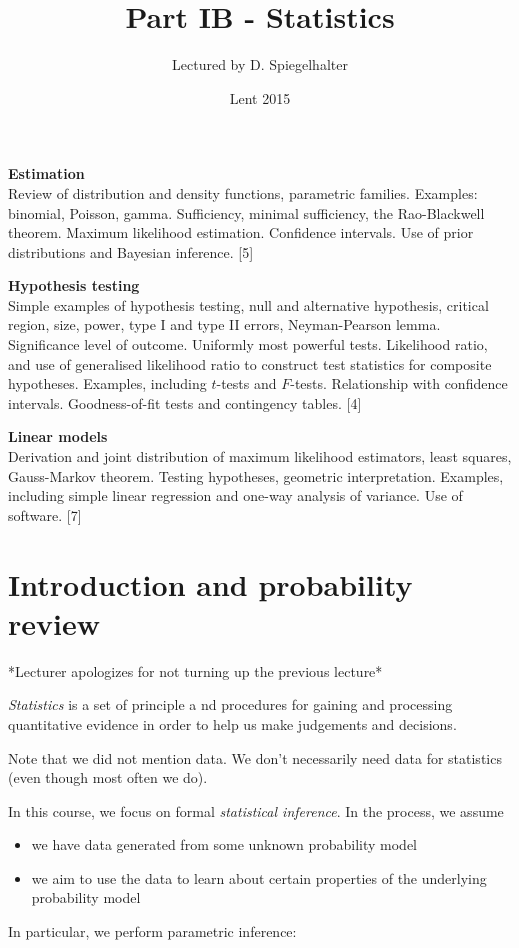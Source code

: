 \documentclass[a4paper]{article}
\title{Part IB - Statistics}
\author{Lectured by D. Spiegelhalter}
\date{Lent 2015}
\begin{document}
\maketitle
{\small
\noindent\textbf{Estimation}\\
Review of distribution and density functions, parametric families. Examples: binomial, Poisson, gamma.  Sufficiency, minimal sufficiency, the Rao-Blackwell theorem. Maximum likelihood estimation. Confidence intervals. Use of prior distributions and Bayesian inference.\hspace*{\fill} [5]

\vspace{10pt}
\noindent\textbf{Hypothesis testing}\\
Simple examples of hypothesis testing, null and alternative hypothesis, critical region, size, power, type I and type II errors, Neyman-Pearson lemma. Significance level of outcome. Uniformly most powerful tests. Likelihood ratio, and use of generalised likelihood ratio to construct test statistics for composite hypotheses. Examples, including $t$-tests and $F$-tests. Relationship with confidence intervals. Goodness-of-fit tests and contingency tables.\hspace*{\fill} [4]

\vspace{10pt}
\noindent\textbf{Linear models}\\
Derivation and joint distribution of maximum likelihood estimators, least squares, Gauss-Markov theorem. Testing hypotheses, geometric interpretation. Examples, including simple linear regression and one-way analysis of variance. Use of software.\hspace*{\fill} [7]}

\tableofcontents

\section{Introduction and probability review}
*Lecturer apologizes for not turning up the previous lecture*
\begin{defi}[Statistics]
  \emph{Statistics} is a set of principle a nd procedures for gaining and processing quantitative evidence in order to help us make judgements and decisions.
\end{defi}
Note that we did not mention data. We don't necessarily need data for statistics (even though most often we do).

In this course, we focus on formal \emph{statistical inference}. In the process, we assume
\begin{itemize}
  \item we have data generated from some unknown probability model
  \item we aim to use the data to learn about certain properties of the underlying probability model
\end{itemize}
In particular, we perform parametric inference:
\end{document}
